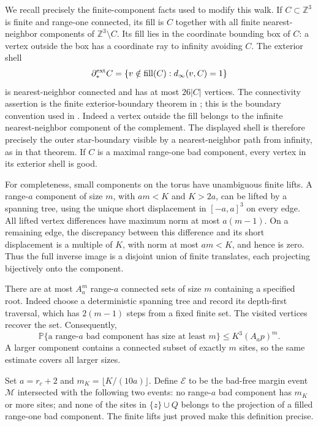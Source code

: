 We recall precisely the finite-component facts used to modify this
walk.  If \(C\subset\mathbb Z^3\) is finite and range-one connected,
its fill is \(C\) together with all finite nearest-neighbor components
of \(\mathbb Z^3\setminus C\).  Its fill lies in the coordinate
bounding box of \(C\): a vertex outside the box has a coordinate ray
to infinity avoiding \(C\).  The exterior shell
\[
 \partial_*^{\rm ext}C
 =\{v\notin\operatorname{fill}(C):d_\infty(v,C)=1\}
\]
is nearest-neighbor connected and has at most \(26|C|\) vertices.
The connectivity assertion is the finite exterior-boundary theorem in
\cite[Theorem~4]{Timar}; this is the boundary convention used in
\cite[Section~7]{H}.  Indeed a vertex outside the fill belongs to the
infinite nearest-neighbor component of the complement.  The displayed
shell is therefore precisely the outer star-boundary visible by a
nearest-neighbor path from infinity, as in that theorem.  If \(C\) is a maximal
range-one bad component, every vertex in its exterior shell is good.

For completeness, small components on the torus have unambiguous
finite lifts.  A range-\(a\) component of size \(m\), with
\(am<K\) and \(K>2a\), can be lifted by a spanning tree, using the
unique short displacement in \([-a,a]^3\) on every edge.  All lifted
vertex differences have maximum norm at most \(a(m-1)\).  On a
remaining edge, the discrepancy between this difference and its short
displacement is a multiple of \(K\), with norm at most \(am<K\),
and hence is zero.  Thus the full inverse image is a disjoint union of
finite translates, each projecting bijectively onto the component.

There are at most \(A_a^m\) range-\(a\) connected sets of size
\(m\) containing a specified root.  Indeed choose a deterministic
spanning tree and record its depth-first traversal, which has
\(2(m-1)\) steps from a fixed finite set.  The visited vertices recover
the set.  Consequently,
\begin{equation}\label{rt:animal}
 \mathbb P\{\text{a range-\(a\) bad component has size at least }m\}
 \le K^3(A_ap)^m.
\end{equation}
A larger component contains a connected subset of exactly \(m\)
sites, so the same estimate covers all larger sizes.

Set \(a=r_c+2\) and \(m_K=\lfloor K/(10a)\rfloor\).  Define
\(\mathcal E\) to be the bad-free margin event \(\mathcal M\)
intersected with the following two events: no range-\(a\) bad component
has \(m_K\) or more sites; and none of the sites in \(\{z\}\cup Q\)
belongs to the projection of a filled range-one bad component.  The
finite lifts just proved make this definition precise.

